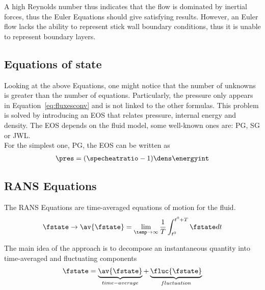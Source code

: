 \documentclass[../main.tex]{subfiles}
\begin{document}
A high Reynolds number thus indicates that the flow is dominated by inertial forces, thus the Euler Equations should give satisfying results. However, an Euler flow lacks the ability to represent stick wall boundary conditions, thus it is unable to represent boundary layers.

\subsection{Equations of state}
Looking at the above Equations, one might notice that the number of unknowns is greater than the number of equations. Particularly, the pressure only appears in Equation~\eqref{eq:fluxesconv} and is not linked to the other formulas. This problem is solved by introducing an \acf{EOS} that relates pressure, internal energy and density. The \ac{EOS} depends on the fluid model, some well-known ones are: \ac{PG}, \ac{SG} or \ac{JWL}.\\
For the simplest one, PG, the \ac{EOS} can be written as
\begin{align}\label{eq:eos_pg}
\pres=(\specheatratio-1)\dens\energyint
\end{align}


\subsection{\acf{RANS} Equations}\label{sec:rans}
The \acf{RANS} Equations are time-averaged equations of motion for the fluid.
\begin{align}\label{eq:rans_averaging}
\fstate \rightarrow \av{\fstate} = \lim_{\temp \to \infty} \frac{1}{T} \int_{t^0}^{t^0+T} \fstate dt
\end{align}

The main idea of the approach is to decompose an instantaneous quantity into time-averaged and fluctuating components
\begin{align}\label{eq:rans_decomposition}
\fstate=\underbrace{\av{\fstate}}_{time-average}+\underbrace{\fluc{\fstate}}_{fluctuation}
\end{align}
\end{document}
